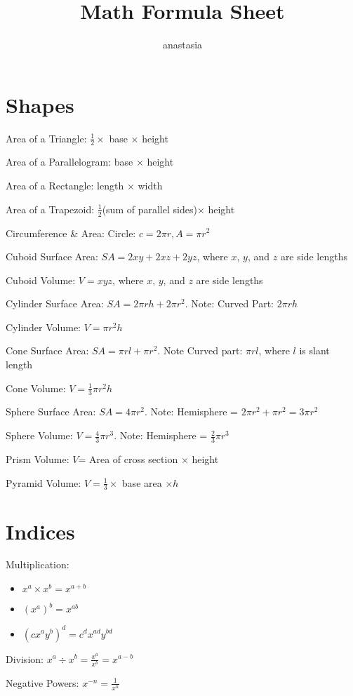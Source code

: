 \documentclass[10pt,a4paper,oneside]{book}
\title{Math Formula Sheet}
\author{anastasia}
\begin{document}
\maketitle
\section*{Shapes}
Area of a Triangle: $\frac{1}{2} \times$ base $\times$ height 

Area of a Parallelogram: base $\times$ height 

Area of a Rectangle: length $\times$ width 

Area of a Trapezoid: $\frac{1}{2}$(sum of parallel sides)$\times$ height 

Circumference \& Area: Circle: $c=2\pi r, A=\pi r^2$

Cuboid Surface Area: $SA=2xy+2xz+2yz$, where $x$, $y$, and $z$ are side lengths 

Cuboid Volume: $V=xyz$, where $x$, $y$, and $z$ are side lengths 

Cylinder Surface Area: $SA=2\pi rh+2\pi r^2$. Note: Curved Part: $2\pi rh$

Cylinder Volume: $V=\pi r^2 h$

Cone Surface Area: $SA=\pi r l +\pi r^2$. Note Curved part: $\pi r l$, where $l$ is slant length 

Cone Volume: $V=\frac{1}{3}\pi r^2 h$

Sphere Surface Area: $SA=4\pi r^2$. Note: Hemisphere = $2\pi r^2+\pi r^2 = 3\pi r^2$

Sphere Volume: $V=\frac{4}{3}\pi r^3$. Note: Hemisphere = $\frac{2}{3}\pi r^3$

Prism Volume: $V$= Area of cross section $\times$ height 

Pyramid Volume: $V=\frac{1}{3}\times$ base area $\times h$

\section*{Indices}
Multiplication:
\begin{itemize}
    \item $x^a \times x^b = x^{a+b}$
    \item $(x^a)^b=x^{ab}$
    \item $(cx^ay^b)^d=c^dx^{ad}y^{bd}$
\end{itemize}

Division: $x^a\div x^b = \frac{x^a}{x^b}=x^{a-b}$

Negative Powers: $x^{-n}=\frac{1}{x^n}$
\end{document}
